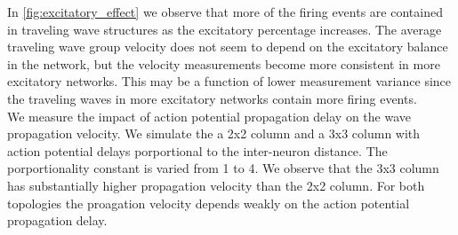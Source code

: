\documentclass[a4paper,11pt]{article}
\begin{document}
In \ref{fig:excitatory_effect} we observe that more of the firing events are contained in traveling wave structures as the excitatory percentage increases.
The average traveling wave group velocity does not seem to depend on the excitatory balance in the network, but the velocity measurements become more consistent in more excitatory networks.
This may be a function of lower measurement variance since the traveling waves in more excitatory networks contain more firing events.
\\
We measure the impact of action potential propagation delay on the wave propagation velocity.
We simulate the a 2x2 column and a 3x3 column with action potential delays porportional to the inter-neuron distance.
The porportionality constant is varied from 1 to 4. 
We observe that the 3x3 column has substantially higher propagation velocity than the 2x2 column.
For both topologies the proagation velocity depends weakly on the action potential propagation delay.
\end{document}

